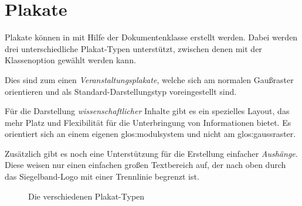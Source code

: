 \chapter{Plakate}

Plakate können in \tubslatex mit Hilfe der Dokumentenklasse  erstellt werden.
Dabei werden drei unterschiedliche Plakat-Typen unterstützt,
zwischen denen mit der Klassenoption  gewählt werden kann.

Dies sind zum einen \emph{Veranstaltungsplakate},
welche sich am normalen Gaußraster
orientieren und als Standard-Darstellungstyp voreingestellt sind.

Für die Darstellung \emph{wissenschaftlicher} Inhalte gibt es ein spezielles Layout,
das mehr Platz und Flexibilität für die Unterbringung von Informationen bietet.
Es orientiert sich an einem eigenen \gls{glos:modulsystem} und nicht am
\gls{glos:gaussraster}.

Zusätzlich gibt es noch eine Unterstützung für die Erstellung einfacher
\emph{Aushänge}. Diese weisen nur einen einfachen großen Textbereich auf, der
nach oben durch das Siegelband-Logo mit einer Trennlinie begrenzt ist.

\begin{figure}[htp]\centering
{}
\begin{minipage}{0.32\textwidth}\centering
\end{minipage}
\begin{minipage}{0.32\textwidth}\centering
\end{minipage}
\begin{minipage}{0.32\textwidth}\centering
\end{minipage}
\caption{Die verschiedenen Plakat-Typen}
\end{figure}

\begin{Declaration}
\end{Declaration}

